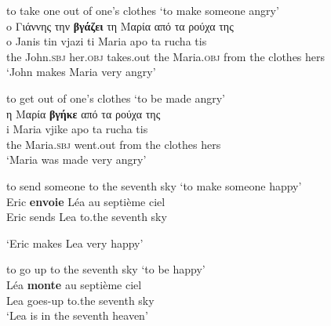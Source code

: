 \documentclass[output=paper]{langsci/langscibook}
\begin{document}
\begin{exe}
\settowidth {}
\ex \label{ex:3:29}
to take one out of one's clothes `to make someone angry'\\
\glll o Γιάννης την \textbf{βγάζει} τη Μαρία από τα ρούχα της  \\
o Janis tin vjazi ti Maria apo ta rucha tis {}\\
the John.\textsc{sbj} her.\textsc{obj}  takes.out the Maria.\textsc{obj} from the clothes hers {}\\
\glt %
‘John makes Maria very angry’
\end{exe}

\begin{exe}
\settowidth {}
\ex \label{ex:3:30}
to get out of one's clothes `to be made angry'\\
\glll η Μαρία \textbf{βγήκε} από τα ρούχα της  \\
i Maria vjike apo ta rucha tis {}\\
the Maria.\textsc{sbj} went.out from the clothes hers {}\\ 
\glt %
‘Maria was made very angry’
\end{exe}

\begin{exe}
\settowidth {}
\ex \label{ex:3:31}
to send someone to the seventh sky `to make someone happy'\\
\gll Eric \textbf{envoie} Léa au septième ciel  \\
Eric sends Lea to.the seventh sky {}\\ 
\glt %

‘Eric makes Lea very happy’
\end{exe}

\begin{exe}
\settowidth {}
\ex \label{ex:3:32}
to go up to the seventh sky `to be happy'\\
\gll Léa \textbf{monte} au septième ciel \\
Lea goes-up to.the seventh sky {}\\  
\glt %
‘Lea is in the seventh heaven’
\end{exe}
\end{document}
